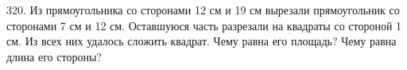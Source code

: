 320. Из прямоугольника со сторонами 12 см и 19 см вырезали прямоугольник со сторонами 7 см и 12 см. Оставшуюся часть разрезали на квадраты со стороной 1 см. Из всех них удалось сложить квадрат. Чему равна его площадь? Чему равна длина его стороны?\\
